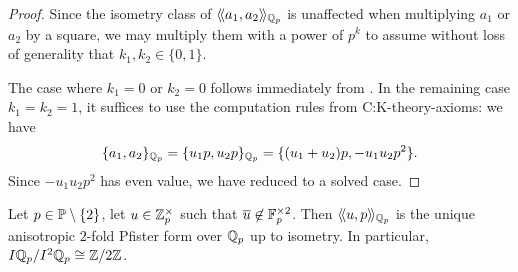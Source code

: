 \documentclass[12pt, leqno, british]{amsart}
\begin{document}
\begin{proof}
Since the isometry class of $\langle\!\langle a_1, a_2 \rangle\!\rangle_{\mathbb Q_p}$ is unaffected when multiplying $a_1$ or $a_2$ by a square, we may multiply them with a power of $p^k$ to assume without loss of generality that $k_1, k_2 \in \lbrace 0, 1 \rbrace$.

The case where $k_1 = 0$ or $k_2 = 0$ follows immediately from .
In the remaining case $k_1 = k_2 = 1$, it suffices to use the computation rules from {C:K-theory-axioms}: we have
$$ \lbrace a_1, a_2 \rbrace_{\mathbb Q_p} = \lbrace u_1p, u_2p \rbrace_{\mathbb Q_p} = \lbrace (u_1+u_2)p, -u_1u_2p^2\rbrace.$$
Since $-u_1u_2p^2$ has even value, we have reduced to a solved case.
\end{proof}
\begin{cor}\label{C:unique-2-fold-Pfister-qqp-odd}
Let $p \in \mathbb P \setminus \lbrace 2 \rbrace$, let $u \in \mathbb Z_p^\times$ such that $\overline{u} \not\in \mathbb F_p^{\times 2}$.
Then $\langle\!\langle u, p \rangle\!\rangle_{\mathbb Q_p}$ is the unique anisotropic $2$-fold Pfister form over $\mathbb Q_p$ up to isometry.
In particular, $I\mathbb Q_p/I^2\mathbb Q_p \cong \mathbb Z/2\mathbb Z$.
\end{cor}
\end{document}
